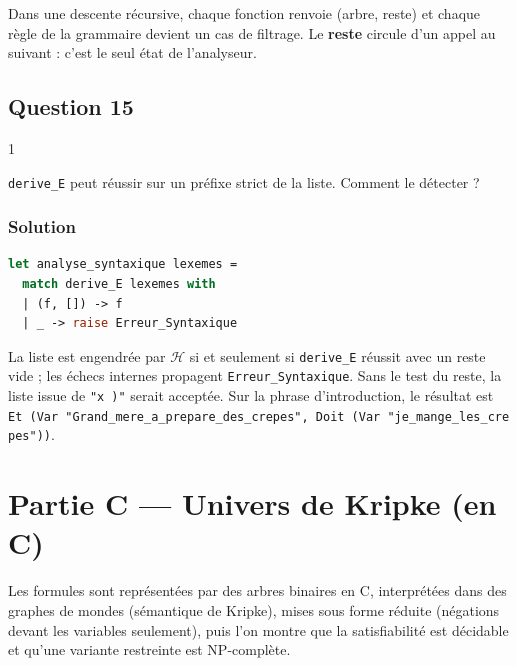 \documentclass[11pt,a4paper]{article}
\begin{document}
\begin{methode}

Dans une descente récursive, chaque fonction renvoie (arbre, reste) et chaque règle de la grammaire devient un cas de filtrage. Le \textbf{reste} circule d'un appel au suivant : c'est le seul état de l'analyseur.

\end{methode}

\hypertarget{question-15}{%
\subsection{Question 15}\label{question-15}}

\begin{indication}{1}

\texttt{derive\_E} peut réussir sur un préfixe strict de la liste. Comment le détecter ?

\end{indication}

\hypertarget{solution-14}{%
\subsubsection{Solution}\label{solution-14}}

\begin{lstlisting}[language=Caml]
let analyse_syntaxique lexemes =
  match derive_E lexemes with
  | (f, []) -> f
  | _ -> raise Erreur_Syntaxique
\end{lstlisting}

La liste est engendrée par \(\mathcal H\) si et seulement si \texttt{derive\_E} réussit avec un reste vide ; les échecs internes propagent \texttt{Erreur\_Syntaxique}. Sans le test du reste, la liste issue de \texttt{"x\ )"} serait acceptée. Sur la phrase d'introduction, le résultat est \texttt{Et\ (\allowbreak{}Var\ "Grand\_mere\_a\_prepare\_des\_crepes",\allowbreak{}\ Doit\ (\allowbreak{}Var\ "je\_mange\_les\_crepes")\allowbreak{})\allowbreak{}}.

\hypertarget{partie-c-univers-de-kripke-en-c}{%
\section{Partie C --- Univers de Kripke (en C)}\label{partie-c-univers-de-kripke-en-c}}

Les formules sont représentées par des arbres binaires en C, interprétées dans des graphes de mondes (sémantique de Kripke), mises sous forme réduite (négations devant les variables seulement), puis l'on montre que la satisfiabilité est décidable et qu'une variante restreinte est NP-complète.
\end{document}
